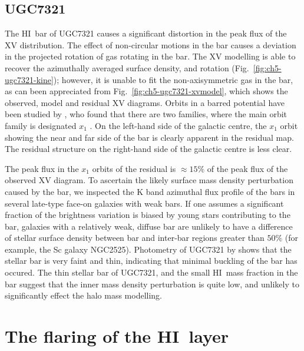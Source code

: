 \documentclass[traditabstract]{aa} %
\newcommand\HI{H{\small I}}
\begin{document}
\subsection{UGC7321}
\label{sec:ch5-results_ugc7321}


The \HI\ bar of UGC7321 causes a significant distortion in the peak
flux of the XV distribution. The effect of non-circular motions in the
bar causes a deviation in the projected rotation of gas rotating in
the bar. The XV modelling is able to recover the azimuthally averaged
surface density, and rotation (Fig.~\ref{fig:ch5-ugc7321-kine});
however, it is unable to fit the non-axisymmetric gas in the bar, 
as can been appreciated from
Fig.~\ref{fig:ch5-ugc7321-xvmodel}, which shows the observed, model and 
residual XV diagrams. Orbits in a
barred potential have been studied by \citet{cm1977}, who found that
there are two families, where the main orbit family is designated 
$x_1$ \citep[see also][]{bcsbu1991}. On the left-hand 
side of the galactic centre, the $x_1$ orbit showing the near and far
side of the bar is clearly apparent in the residual map. 
The residual structure on
the right-hand side of the galactic centre is less clear.

The peak flux in the $x_1$ orbits of the residual is $\approx15\%$ of the
peak flux of the observed XV diagram. To ascertain the likely surface mass
density perturbation caused by the bar, we inspected the K band
azimuthal flux profile of the bars in several late-type face-on
galaxies with weak bars. If one assumes a significant fraction of the
brightness variation is biased by young stars contributing to
the bar, galaxies with a relatively weak, diffuse bar are
unlikely to have a difference of stellar surface density between bar and 
inter-bar regions greater than $50\%$ (for example, the Sc
galaxy NGC2525). Photometry of UGC7321 by \citet{pbld2003}
shows that the stellar bar is very faint and thin, indicating that
minimal buckling of the bar has occured. The thin stellar bar of
UGC7321, and the small \HI\ mass fraction in the bar suggest that the
inner mass density perturbation is quite low, and
unlikely to significantly effect the halo mass modelling.



\section{The flaring of the \HI\ layer}
\end{document}
